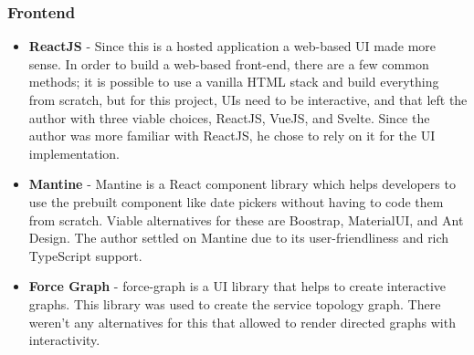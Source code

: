 \subsubsection{Frontend}
\begin{itemize}[noitemsep,nolistsep] 
    \item \textbf{ReactJS} - Since this is a hosted application a web-based UI made more sense. In order to build a web-based front-end, there are a few common methods; it is possible to use a vanilla HTML stack and build everything from scratch, but for this project, UIs need to be interactive, and that left the author with three viable choices, ReactJS, VueJS, and Svelte. Since the author was more familiar with ReactJS, he chose to rely on it for the UI implementation.
    \item \textbf{Mantine} - Mantine is a React component library which helps developers to use the prebuilt component like date pickers without having to code them from scratch. Viable alternatives for these are Boostrap, MaterialUI, and Ant Design. The author settled on Mantine due to its user-friendliness and rich TypeScript support.
    \item \textbf{Force Graph} - force-graph is a UI library that helps to create interactive graphs. This library was used to create the service topology graph. There weren't any alternatives for this that allowed to render directed graphs with interactivity.
\end{itemize}


